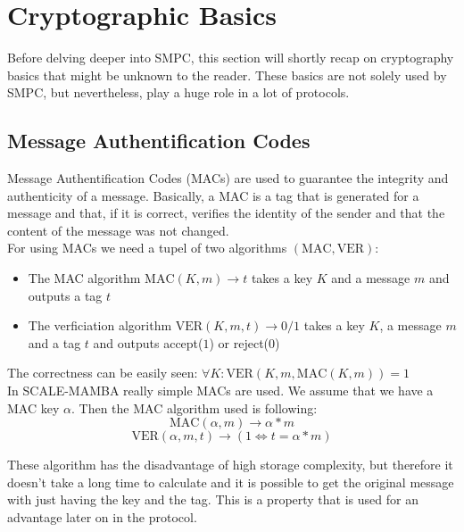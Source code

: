 \documentclass[english,runningheads,a4paper]{llncs}[2018/03/10]
\begin{document}
\section{Cryptographic Basics}\label{sec:basics}

Before delving deeper into SMPC, this section will shortly recap on cryptography basics that might be unknown to the reader. These basics are not solely used by SMPC, but nevertheless, play a huge role in a lot of protocols.

\subsection{Message Authentification Codes}
Message Authentification Codes (MACs) are used to guarantee the integrity and authenticity of a message. Basically, a MAC is a tag that is generated for a message and that, if it is correct, verifies the identity of the sender and that the content of the message was not changed.\\
For using MACs we need a tupel of two algorithms \((\text{MAC},\text{VER})\):\\
\begin{itemize}
\item The MAC algorithm \(\text{MAC}(K,m)\rightarrow t\) takes a key \(K\) and a message \(m\) and outputs a tag \(t\)\\
\item The verficiation algorithm \(\text{VER}(K,m,t)\rightarrow 0/1\) takes a key \(K\), a message \(m\) and a tag \(t\) and outputs accept(\(1\)) or reject(\(0\))\\
\end{itemize}
The correctness can be easily seen: \(\forall K: \text{VER}(K,m,\text{MAC}(K,m))=1\)\\


In SCALE-MAMBA really simple MACs are used. We assume that we have a MAC key \( \alpha \). Then the MAC algorithm used is following:\\
$$\text{MAC}(\alpha,m)\rightarrow \alpha * m$$ 
$$\text{VER}(\alpha,m,t)\rightarrow (1 \Leftrightarrow t = \alpha*m) $$ 

These algorithm has the disadvantage of high storage complexity, but therefore it doesn't take a long time to calculate and it is possible to get the original message with just having the key and the tag. This is a property that is used for an advantage later on in the protocol.\\
\end{document}

